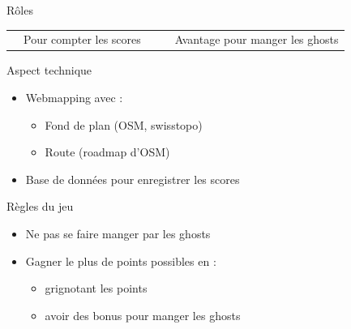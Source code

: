\documentclass{beamer}
\begin{document}
\begin{frame}{Rôles}
\begin{table}
\begin{tabular}{lp{2cm}p{0.5cm}lp{2cm}}
                                                                                 & {\footnotesize Pour compter les scores} & &                                                               & {\footnotesize Avantage pour manger les ghosts}             \\
            \end{tabular}
    \end{table}
\end{frame}

\begin{frame}{Aspect technique}
    \begin{itemize}[label=$\rhd$]
        \item Webmapping avec :
        \begin{itemize}[label=>]
            \item Fond de plan (OSM, swisstopo)
            \item Route (roadmap d'OSM)
        \end{itemize}
        \item Base de données pour enregistrer les scores
    \end{itemize}
\end{frame}

\begin{frame}{Règles du jeu}
    \begin{itemize}[label=$\rhd$]
        \item Ne pas se faire manger par les ghosts
        \item Gagner le plus de points possibles en :
        \begin{itemize}[label=>]
            \item grignotant les points
            \item avoir des bonus pour manger les ghosts
        \end{itemize}
    \end{itemize}
\end{frame}
\end{document}
